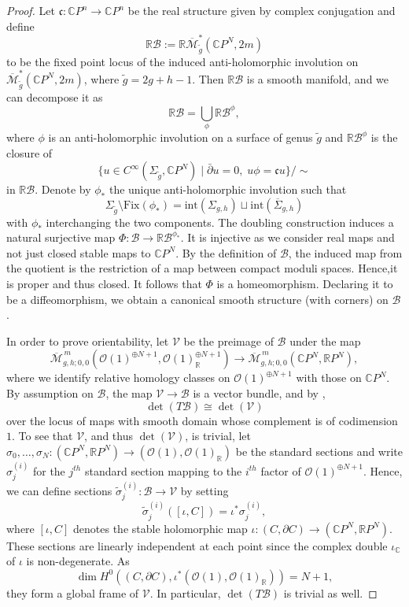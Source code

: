 \documentclass[11pt,psamsfonts, oneside, reqno]{amsart}
\newcommand{\cc}[1]{\overline{#1}}
\newcommand{\union}[2]{\bigcup\limits_{#1}{#2}}%
\newcommand{\sm}{\ensuremath{\setminus}}%
\newcommand{\cl}{\colon}
\newcommand{\Mbar}{\overline{\mathcal M}}
\newcommand{\delbar}{\bar\partial}
\newcommand{\del}{\partial}
\newcommand{\bC}{\mathbb{C}}
\newcommand{\bR}{\mathbb{R}}
\newcommand{\cB}{\mathcal{B}}
\newcommand{\cO}{\mathcal{O}}
\newcommand{\cV}{\mathcal{V}}
\newcommand{\fc}{\mathfrak{c}}
\newcommand{\wt}{\widetilde}
\theoremstyle{definition}
\theoremstyle{remark}
\numberwithin{equation}{section}
\begin{document}
\begin{proof} Let $\fc \cl \bC P^n \to \bC P^n$ be the real structure given by complex conjugation and define $$\bR\cB := \bR\Mbar_{\tilde{g}}^*(\bC P^N,2m)$$\noindent
	to be the fixed point locus of the induced anti-holomorphic involution on $\Mbar_{\tilde{g}}^*(\bC P^N,2m)$, where $\tilde{g} =2g+h-1$. Then $\bR\cB$ is a smooth manifold, and we can decompose it as
	$$\bR\cB = \union{\phi}{\bR\cB^\phi},$$\noindent
	where $\phi$ is an anti-holomorphic involution on a surface of genus $\tilde{g}$ and $\bR\cB^\phi$ is the closure of 
	$$\{u \in C^\infty(\Sigma_{\tilde{g}},\bC P^N) \mid\delbar u = 0,\; u\phi = \fc u\}/\sim$$\noindent
	in $\bR\cB$. Denote by $\phi_*$ the unique anti-holomorphic involution such that 
	$$\Sigma_{\tilde{g}}\sm \text{Fix}(\phi_*) = \text{int}(\Sigma_{g,h})\sqcup \text{int}(\cc{\Sigma}_{g,h})$$\noindent
	with $\phi_*$ interchanging the two components.
	The doubling construction induces a natural surjective map $\Phi\cl \cB \to \bR\cB^{\phi_*}.$
	It is injective as we consider real maps and not just closed stable maps to $\bC P^N$. By the definition of $\cB$, the induced map from the quotient is the restriction of a map between compact moduli spaces. Hence,it is proper and thus closed. It follows that $\Phi$ is a homeomorphism. Declaring it to be a diffeomorphism, we obtain a canonical smooth structure (with corners) on $\cB$.\par
	In order to prove orientability, let $\cV$ be the preimage of $\cB$ under the map 
	$$\Mbar_{g,h;0,0}^{\,m}(\cO(1)^{\oplus N+1},\cO(1)_\bR^{\oplus N+1})\to \Mbar_{g,h;0,0}^{\,m}(\bC P^N,\bR P^{N}),$$\noindent
	where we identify relative homology classes on $\cO(1)^{\oplus N+1}$ with those on $\bC P^N$.
	By assumption on $\cB$, the map $\cV\to \cB$ is a vector bundle, and by \cite[Corollary~1.10]{Ge13}, 
	\begin{equation}\label{eq:tangent-bundle-base}\det(T\cB)\cong\det(\cV) \end{equation} 
	over the locus of maps with smooth domain whose complement is of codimension $1$. To see that $\cV$, and thus $\det(\cV)$, is trivial, let $\sigma_0,\dots,\sigma_N\cl (\bC P^N,\bR P^N) \to (\cO(1),\cO(1)_\bR)$ be the standard sections and write $\sigma_j^{(i)}$ for the $j^{th}$ standard section mapping to the $i^{th}$ factor of $\cO(1)^{\oplus N+1}$. Hence, we can define sections $\wt\sigma_j^{(i)}\cl \cB\to \cV$ by setting 
	$$\wt\sigma_j^{(i)}([\iota,C]) = \iota^*\sigma_j^{(i)},$$\noindent
	where $[\iota,C]$ denotes the stable holomorphic map $\iota \cl (C,\del C)\to (\bC P^N, \bR P^N)$.
	These sections are linearly independent at each point since the complex double $\iota_\bC$ of $\iota$ is non-degenerate. As $$\dim H^0((C,\del C),\iota^*(\cO(1),\cO(1)_\bR)) = N+1,$$\noindent
	they form a global frame of $\cV$. In particular, $\det(T\cB)$ is trivial as well.
\end{proof}
\end{document}
